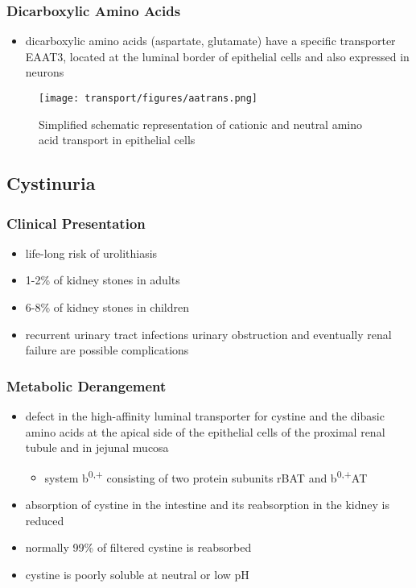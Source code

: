 \documentclass{scrartcl}
\begin{document}
\subsubsection{Dicarboxylic Amino Acids}
\label{sec:org4b635d9}
\begin{itemize}
\item dicarboxylic amino acids (aspartate, glutamate) have a specific
transporter EAAT3, located at the luminal border
of epithelial cells and also expressed in neurons
\end{itemize}

\begin{figure}[htbp]
\centering
\texttt{[image: transport/figures/aatrans.png]}
\caption{\label{fig:org526b422}Simplified schematic representation of cationic and neutral amino acid transport in epithelial cells}
\end{figure}

\subsection{Cystinuria}
\label{sec:org5a366fc}
\subsubsection{Clinical Presentation}
\label{sec:org13ca7e7}
\begin{itemize}
\item life-long risk of urolithiasis
\item 1-2\% of kidney stones in adults
\item 6-8\% of kidney stones in children
\item recurrent urinary tract infections urinary obstruction and
eventually renal failure are possible complications
\end{itemize}

\subsubsection{Metabolic Derangement}
\label{sec:org4a9b57e}
\begin{itemize}
\item defect in the high-affinity luminal transporter for cystine and the
dibasic amino acids at the apical side of the epithelial cells of
the proximal renal tubule and in jejunal mucosa 
\begin{itemize}
\item system b\textsuperscript{0,+} consisting of two protein subunits rBAT and b\textsuperscript{0,+}AT
\end{itemize}
\item absorption of cystine in the intestine and its reabsorption in the
kidney is reduced
\item normally 99\% of filtered cystine is reabsorbed
\item cystine is poorly soluble at neutral or low pH
\end{itemize}
\end{document}
